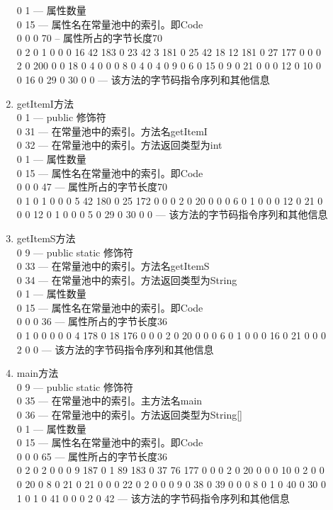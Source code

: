 \begin{description}
\begin{enumerate}
		0 1  --- 属性数量\\
		0 15 ---  属性名在常量池中的索引。即Code\\
		0 0 0 70 -- 属性所占的字节长度70\\
		0 2 0 1 0 0 0 16 42 183 0 23 42 3 181 0 25 42 18 12 181 0 27 177 0 0 0 2 0 200 0 0 18 0 4 0 0 0 8 0 4 0 4 0 9 0 6 0 15 0 9 0 21 0 0 0 12 0 10 0 0 16 0 29 0 30 0 0
		---	该方法的字节码指令序列和其他信息
	\item getItemI方法\\
		0 1  --- public 修饰符\\
		0 31 --- 在常量池中的索引。方法名getItemI\\
		0 32 --- 在常量池中的索引。方法返回类型为int\\
		0 1  --- 属性数量\\
		0 15 --- 属性名在常量池中的索引。即Code\\
		0 0 0 47 ---  属性所占的字节长度70\\
		0 1 0 1 0 0 0 5 42 180 0 25 172 0 0 0 2 0 20 0 0 0 6 0 1 0 0 0 12 0 21 0 0 0 12 0 1 0 0 0 5 0 29 0 30 0 0 --- 该方法的字节码指令序列和其他信息
	\item getItemS方法\\
		0 9  --- public static 修饰符\\
		0 33 --- 在常量池中的索引。方法名getItemS\\
		0 34 --- 在常量池中的索引。方法返回类型为String\\
		0 1  --- 属性数量\\
		0 15 --- 属性名在常量池中的索引。即Code\\
		0 0 0 36 ---  属性所占的字节长度36\\
		0 1 0 0 0 0 0 4 178 0 18 176 0 0 0 2 0 20 0 0 0 6 0 1 0 0 0 16 0 21 0 0 0 2 0 0 --- 该方法的字节码指令序列和其他信息
	\item main方法\\
		0 9  --- public static 修饰符\\
		0 35 ---  在常量池中的索引。主方法名main\\
		0 36 --- 在常量池中的索引。方法返回类型为String[]\\
		0 1  --- 属性数量\\
		0 15 ---  属性名在常量池中的索引。即Code\\
		0 0 0 65 --- 属性所占的字节长度36\\
		0 2 0 2 0 0 0 9 187 0 1 89 183 0 37 76 177 0 0 0 2 0 20 0 0 0 10 0 2 0 0 0 20 0 8 0 21 0 21 0 0 0 22 0 2 0 0 0 9 0 38 0 39 0 0 0 8 0 1 0 40 0 30 0 1 0 1 0 41 0 0 0 2 0 42
		--- 该方法的字节码指令序列和其他信息
	\end{enumerate}
\end{description}
